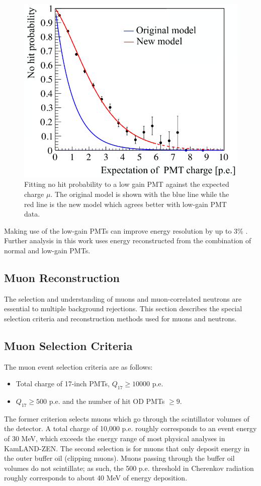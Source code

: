 \begin{figure}[htb]
	\centering
	\includegraphics[scale=0.4]{no-hitprob.png}
	\caption{Fitting no hit probability to a low gain PMT against the expected charge $\mu$. The original model is shown with the blue line while the red line is the new model which agrees better with low-gain PMT data.}
	\label{fig:nohit_prob}
\end{figure}

Making use of the low-gain PMTs can improve energy resolution by up to 3\% \cite{karino_master}. Further analysis in this work uses energy reconstructed from the combination of normal and low-gain PMTs.

\subsection{Muon Reconstruction}
The selection and understanding of muons and muon-correlated neutrons are essential to multiple background rejections. This section describes the special selection criteria and reconstruction methods used for muons and neutrons.
\subsection*{Muon Selection Criteria}
The muon event selection criteria are as follows:
\begin{itemize}
	\item Total charge of 17-inch PMTs, $Q_{17}\geq 10000$ p.e.
	\item $Q_{17}\geq 500$ p.e. and the number of hit OD PMTs $\geq 9$.
\end{itemize}
The former criterion selects muons which go through the scintillator volumes of the detector. A total charge of 10,000 p.e. roughly corresponds to an event energy of 30 MeV, which exceeds the energy range of most physical analyses in KamLAND-ZEN. The second selection is for muons that only deposit energy in the outer buffer oil (clipping muons). Muons passing through the buffer oil volumes do not scintillate; as such, the 500 p.e. threshold in Cherenkov radiation roughly corresponds to about 40 MeV of energy deposition.

